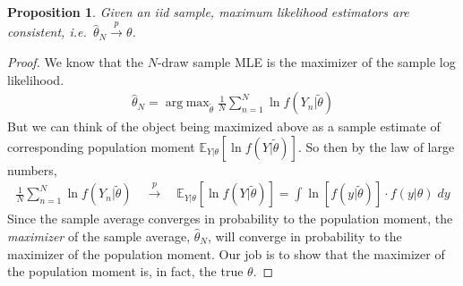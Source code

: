 \documentclass[12pt]{article}
\theoremstyle{plain}
\newtheorem{prop}[thm]{Proposition}
\theoremstyle{definition}
\theoremstyle{remark}
\newcommand{\E}{\mathbb{E}}
\DeclareMathOperator*{\argmax}{arg\;max}
\newcommand{\pto}{\xrightarrow{p}}
\newcommand{\sumnN}{\sum^N_{n=1}}
\begin{document}
\begin{prop}
Given an iid sample, maximum likelihood estimators are consistent, i.e.\
$\hat{\theta}_{N} \pto \theta$.
\end{prop}
\begin{proof}
We know that the $N$-draw sample MLE is the maximizer of the sample log
likelihood.
\begin{align*}
  \hat{\theta}_N
  = \argmax_{\tilde{\theta}}
  \frac{1}{N} \sumnN \ln f(Y_n|\tilde{\theta})
\end{align*}
But we can think of the object being maximized above as a sample
estimate of corresponding population moment
$\E_{Y|\theta}[\ln f(Y|\tilde{\theta})]$.
So then by the law of large numbers,
\begin{align*}
  \frac{1}{N} \sumnN \ln f(Y_n|\tilde{\theta})
  \quad\pto\quad
  \E_{Y|\theta}[\ln f(Y|\tilde{\theta})]
  = \int \ln[f(y|\tilde{\theta})] \cdot f(y|\theta) \; dy
\end{align*}
Since the sample average converges in probability to the population
moment, the \emph{maximizer} of the sample average, $\hat{\theta}_N$, will
converge in probability to the maximizer of the population moment.  Our
job is to show that the maximizer of the population moment is, in fact,
the true $\theta$.


\end{proof}
\end{document}
